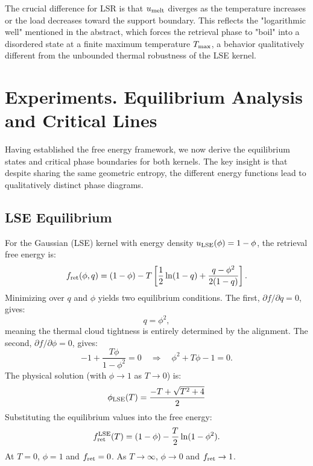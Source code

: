 \documentclass{article}
\theoremstyle{plain}
\theoremstyle{definition}
\theoremstyle{remark}
\begin{document}
The crucial difference for LSR is that $u_{\rm melt}$ diverges as the temperature increases or the load decreases toward the support boundary. This reflects the "logarithmic well" mentioned in the abstract, which forces the retrieval phase to "boil" into a disordered state at a finite maximum temperature $T_{\rm max}$, a behavior qualitatively different from the unbounded thermal robustness of the LSE kernel.


\section{Experiments. Equilibrium Analysis and Critical Lines}

Having established the free energy framework, we now derive the equilibrium states and critical phase boundaries for both kernels. The key insight is that despite sharing the same geometric entropy, the different energy functions lead to qualitatively distinct phase diagrams.

\subsection{LSE Equilibrium}

For the Gaussian (LSE) kernel with energy density $u_{\rm LSE}(\phi) = 1 - \phi$, the retrieval free energy is:
\begin{equation}
    f_{\rm ret}(\phi, q) = (1 - \phi) - T \left[ \frac{1}{2}\ln(1-q) + \frac{q - \phi^2}{2(1-q)} \right].
\end{equation}
Minimizing over $q$ and $\phi$ yields two equilibrium conditions. The first, $\partial f/\partial q = 0$, gives:
\begin{equation}
    q = \phi^2,
    \label{eq:q_constraint}
\end{equation}
meaning the thermal cloud tightness is entirely determined by the alignment. The second, $\partial f/\partial \phi = 0$, gives:
\begin{equation}
    -1 + \frac{T\phi}{1-\phi^2} = 0 \quad \Rightarrow \quad \phi^2 + T\phi - 1 = 0.
\end{equation}
The physical solution (with $\phi \to 1$ as $T \to 0$) is:
\begin{equation}
    \phi_{\rm LSE}(T) = \frac{-T + \sqrt{T^2 + 4}}{2}
    \label{eq:phi_lse}
\end{equation}
Substituting the equilibrium values into the free energy:
\begin{equation}
    f_{\rm ret}^{\rm LSE}(T) = (1 - \phi) - \frac{T}{2}\ln(1 - \phi^2).
    \label{eq:f_lse}
\end{equation}
At $T = 0$, $\phi = 1$ and $f_{\rm ret} = 0$. As $T \to \infty$, $\phi \to 0$ and $f_{\rm ret} \to 1$.
\end{document}
